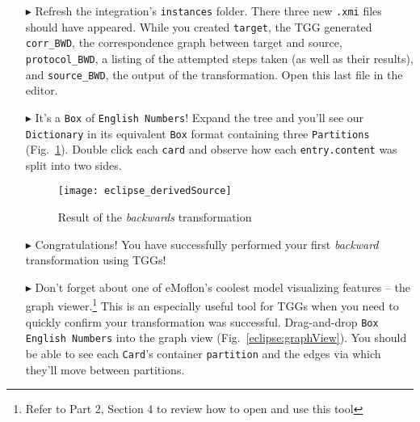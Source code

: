 \begin{itemize}
\vspace{-0.5cm}

\item[$\blacktriangleright$] Refresh the integration's \texttt{instances} folder. There three new \texttt{.xmi} files should have appeared. While you created
\texttt{target}, the TGG generated \texttt{corr\_BWD}, the correspondence graph between target and source, \texttt{protocol\_BWD}, a listing of the attempted
steps taken (as well as their results), and \texttt{source\_BWD}, the output of the transformation. Open this last file in the editor.

\item[$\blacktriangleright$] It's a \texttt{Box} of \texttt{English Numbers}! Expand the tree and you'll see our \texttt{Dictionary} in its equivalent
\texttt{Box} format containing three \texttt{Par\-ti\-tions} (Fig.~\ref{eclipse:derivedBOX}). Double click each \texttt{card} and observe how each
\texttt{entry.content} was split into two sides.

\vspace{0.5cm}

\begin{figure}[htbp]
\begin{center}
  \texttt{[image: eclipse\_derivedSource]}
  \caption{Result of the \emph{backwards} transformation}
  \label{eclipse:derivedBOX}
\end{center}
\end{figure}

\vspace{-0.5cm}

\item[$\blacktriangleright$] Congratulations! You have successfully performed your first \emph{backward} transformation using TGGs!

\newpage

\item[$\blacktriangleright$] Don't forget about one of eMoflon's coolest model visualizing features -- the graph viewer.\footnote{Refer to Part 2, Section 4 to
review how to open and use this tool} This is an especially useful tool for TGGs when you need to quickly confirm your transformation was successful.
Drag-and-drop \texttt{Box English Numbers} into the graph view (Fig.~\ref{eclipse:graphView}). You should be able to see each \texttt{Card}'s container
\texttt{partition} and the edges via which they'll move between partitions.

\vspace{0.5cm}


\end{itemize}
